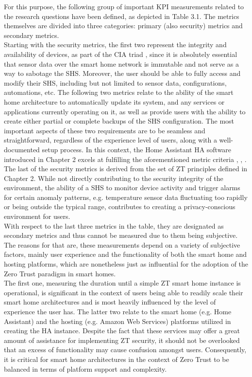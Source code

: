 For this purpose, the following group of important KPI measurements related to the research questions have been defined, as depicted in Table 3.1. The metrics themselves are divided into three categories: primary (also security) metrics and secondary metrics.\\
Starting with the security metrics, the first two represent the integrity and availability of devices, as part of the CIA triad \cite{cia_article}, since it is absolutely essential that sensor data over the smart home network is immutable and not serve as a way to sabotage the SHS. Moreover, the user should be able to fully access and modify their SHS, including but not limited to sensor data, configurations, automations, etc. 
The following two metrics relate to the ability of the smart home architecture to automatically update its system, and any services or applications currently operating on it, as well as provide users with the ability to create either partial or complete backups of the SHS configuration. The most important aspects of these two requirements are to be seamless and straightforward, regardless of the experience level of users, along with a well-documented setup process. In this context, the Home Assistant HA software introduced in Chapter 2 excels at fulfilling the aforementioned metric criteria \cite{ha_auto_update}, \cite{ha_auto_backups}, \cite{ha_backup_integration}. 
The last of the security metrics is derived from the set of ZT principles defined in Chapter 2. While not directly contributing to the security integrity of the environment, the ability of a SHS to monitor device activity and trigger alarms for certain anomaly patterns, e.g. temperature sensor data fluctuating too rapidly or being outside the typical range, contributes to creating a privacy-conscious environment for users.\\
With respect to the last three metrics in the table, they are designated as secondary metrics and thus cannot be measured due to them being subjective. The reasons for that are, these measurements depend on a variety of subjective factors, mainly user experience and the functionality of both the smart home and hosting platforms, which are nonetheless just as influential for the adoption of the Zero Trust paradigm in smart homes.\\
The first one, measuring the duration until a simple ZT smart home instance is operational, is significant in the context of users being able to readily scale their smart home architectures and is most heavily influenced by the level of experience the user has. The latter two relate to the smart home (e.g. Home Assistant) and the hosting (e.g. Amazon Web Services) platforms utilized in creating the HA instance. Despite the fact that these services may offer a great amount of assistance for implementing ZT security, it should not be overlooked that an excess of functionality may cause confusion amongst users. Consequently, it is critical for smart home architectures in the context of Zero Trust to be balanced in terms of platform support and complexity.

